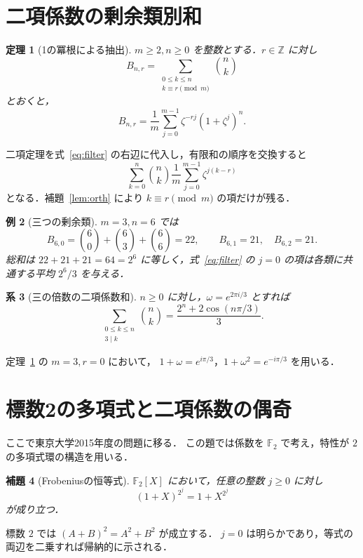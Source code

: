 \documentclass[a5paper,10pt,onecolumn]{jsarticle}
\makeatletter
\theoremstyle{mathnotetheorem}
\newtheorem{theorem}{定理}[section]
\newtheorem{lemma}[theorem]{補題}
\newtheorem{corollary}[theorem]{系}
\newtheorem{example}[theorem]{例}
\renewcommand{\proofname}{証明}
\renewenvironment{proof}[1][\proofname]{%
  \par\pushQED{\qed}\normalfont\topsep4\p@\@plus2\p@\relax
  \trivlist\item[\hskip\labelsep\bfseries #1]\ignorespaces
}{\popQED\endtrivlist\@endpefalse}
\makeatother
\begin{document}
\section{二項係数の剰余類別和}
\begin{theorem}[1の冪根による抽出]\label{thm:roots}
$m\ge2,n\ge0$ を整数とする．$r\in\mathbb Z$ に対し
\[
 B_{n,r}=\sum_{\substack{0\le k\le n\\k\equiv r\pmod m}}\binom nk
\]
とおくと，
\begin{equation}\label{eq:filter}
 B_{n,r}=\frac1m\sum_{j=0}^{m-1}\zeta^{-rj}(1+\zeta^j)^n.
\end{equation}
\end{theorem}
\begin{proof}
二項定理を式~\eqref{eq:filter} の右辺に代入し，有限和の順序を交換すると
\[
 \sum_{k=0}^n\binom nk
  \frac1m\sum_{j=0}^{m-1}\zeta^{j(k-r)}
\]
となる．補題~\ref{lem:orth} により $k\equiv r\pmod m$ の項だけが残る．
\end{proof}

\begin{example}[三つの剰余類]
$m=3,n=6$ では
\[
 B_{6,0}=\binom60+\binom63+\binom66=22,\qquad
 B_{6,1}=21,\quad B_{6,2}=21.
\]
総和は $22+21+21=64=2^6$ に等しく，式~\eqref{eq:filter} の $j=0$ の項は各類に共通する平均 $2^6/3$ を与える．
\end{example}

\begin{corollary}[三の倍数の二項係数和]
$n\ge0$ に対し，$\omega=e^{2\pi i/3}$ とすれば
\[
 \sum_{\substack{0\le k\le n\\3\mid k}}\binom nk=
 \frac{2^n+2\cos(n\pi/3)}3.
\]
\end{corollary}
\begin{proof}
定理~\ref{thm:roots} の $m=3,r=0$ において，
$1+\omega=e^{i\pi/3}$，$1+\omega^2=e^{-i\pi/3}$ を用いる．
\end{proof}

\section{標数2の多項式と二項係数の偶奇}
ここで東京大学2015年度の問題に移る．
この題では係数を $\mathbb F_2$ で考え，特性が $2$ の多項式環の構造を用いる．
\begin{lemma}[Frobeniusの恒等式]\label{lem:frob}
$\mathbb F_2[X]$ において，任意の整数 $j\ge0$ に対し
\[
 (1+X)^{2^j}=1+X^{2^j}
\]
が成り立つ．
\end{lemma}
\begin{proof}
標数 $2$ では $(A+B)^2=A^2+B^2$ が成立する．
$j=0$ は明らかであり，等式の両辺を二乗すれば帰納的に示される．
\end{proof}
\end{document}
